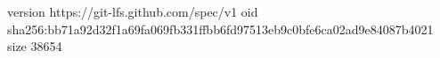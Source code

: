 version https://git-lfs.github.com/spec/v1
oid sha256:bb71a92d32f1a69fa069fb331ffbb6fd97513eb9c0bfe6ca02ad9e84087b4021
size 38654
